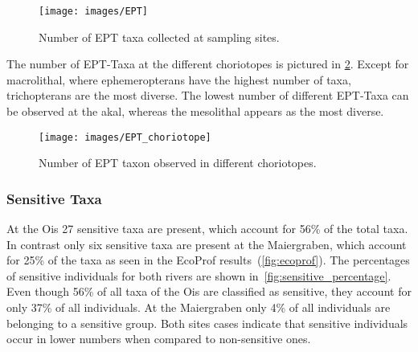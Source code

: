 \begin{figure}[!htb]                              %
  \center
  \texttt{[image: images/EPT]}                %
  \caption{Number of EPT taxa collected at sampling sites.}               %
  \label{fig:EPT}                                                       %
\end{figure}

The number of EPT-Taxa at the different choriotopes is pictured in \cref{fig:EPT_choriotope}. Except for macrolithal, where ephemeropterans have the highest number of taxa, trichopterans are the most diverse. The lowest number of different EPT-Taxa can be observed at the akal, whereas the mesolithal appears as the most diverse.

\begin{figure}[!htb]                              %
  \center
  \texttt{[image: images/EPT\_choriotope]}                %
  \caption{Number of EPT taxon observed in different choriotopes.}               %
  \label{fig:EPT_choriotope}                                                       %
\end{figure}




\subsubsection{Sensitive Taxa}\label{sec:sensitive_taxa_results}  %


At the Ois 27 sensitive taxa are present, which account for 56\% of the total taxa. In contrast only six sensitive taxa are present at the Maiergraben, which account for 25\% of the taxa as seen in the EcoProf results~(\cref{fig:ecoprof}). The percentages of sensitive individuals for both rivers are shown in~\cref{fig:sensitive_percentage}. Even though 56\% of all taxa of the Ois are classified as sensitive, they account for only 37\% of all individuals. At the Maiergraben only 4\% of all individuals are belonging to a sensitive group. Both sites cases indicate that sensitive individuals occur in lower numbers when compared to non-sensitive ones.



